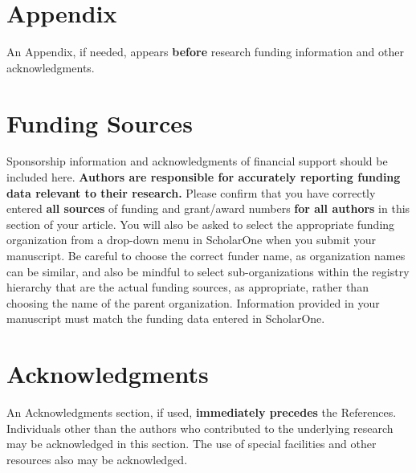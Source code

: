 \documentclass[journal]{new-aiaa}
\begin{document}
\section*{Appendix}

An Appendix, if needed, appears \textbf{before} research funding information and other acknowledgments.

\section*{Funding Sources}

Sponsorship information and acknowledgments of financial support should be included here. \textbf{Authors are responsible for accurately reporting funding data relevant to their research.} Please confirm that you have correctly entered \textbf{all sources} of funding and grant/award numbers \textbf{for all authors} in this section of your article. You will also be asked to select the appropriate funding organization from a drop-down menu in ScholarOne when you submit your manuscript. Be careful to choose the correct funder name, as organization names can be similar, and also be mindful to select sub-organizations within the registry hierarchy that are the actual funding sources, as appropriate, rather than choosing the name of the parent organization. Information provided in your manuscript must match the funding data entered in ScholarOne.

\section*{Acknowledgments}
An Acknowledgments section, if used, \textbf{immediately precedes} the References. Individuals other than the authors who contributed to the underlying research may be acknowledged in this section. The use of special facilities and other resources also may be acknowledged. 


\end{document}
